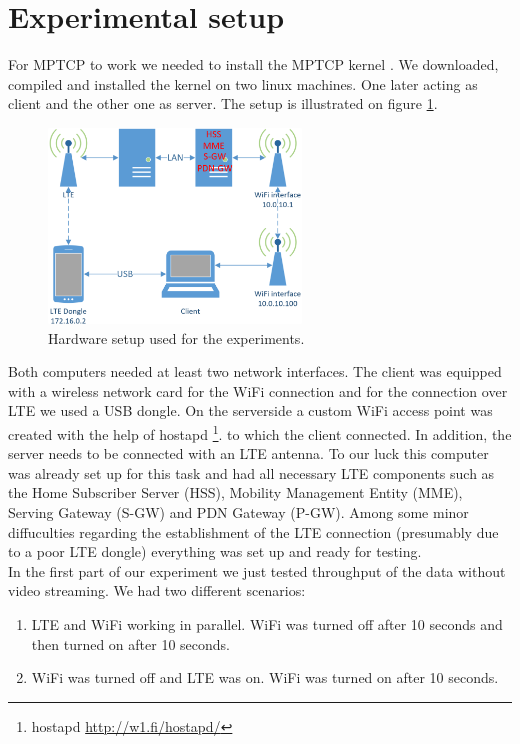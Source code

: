 \documentclass{llncs}
\begin{document}
\section{Experimental setup}
For MPTCP to work we needed to install the MPTCP kernel \cite{linuxMPTCP}.
We downloaded, compiled and installed the kernel on two linux machines. One later acting as client and the other one as server. The setup is illustrated on figure \ref{fig:setup}.\\


\begin{figure}[H]
\centering
\includegraphics[width=0.6\textwidth]{setup.png}
\caption{\label{fig:setup} Hardware setup used for the experiments.}
\end{figure}

Both computers needed at least two network interfaces. The client was equipped with a wireless network card for the WiFi connection and for the connection over LTE we used a USB dongle. On the serverside a custom WiFi access point was created with the help of hostapd \footnote{hostapd \url{http://w1.fi/hostapd/}}. to which the client connected. In addition, the server needs to be connected with an LTE antenna. To our luck this computer was already set up for this task and had all necessary LTE components such as the Home Subscriber Server (HSS), Mobility Management Entity (MME), Serving Gateway (S-GW) and PDN Gateway (P-GW). Among some minor diffuculties regarding the establishment of the LTE connection (presumably
 due to a poor LTE dongle) everything was set up and ready for testing.\\

In the first part of our experiment we just tested throughput of the data without video streaming. We had two different scenarios:

\begin{enumerate}
\item{LTE and WiFi working in parallel. WiFi was turned off after 10 seconds and then turned on after 10 seconds.}
\item{WiFi was turned off and LTE was on. WiFi was turned on after 10 seconds.}
\end{enumerate}
\end{document}
